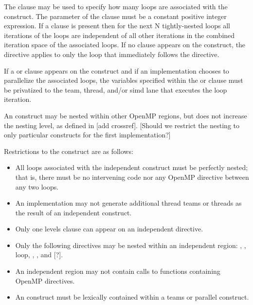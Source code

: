 The  clause may be used to specify how many loops are associated with the
 construct. The parameter of the  clause must be
a constant positive integer expression. If a  clause is present then for the next N
tightly-nested loops all iterations of the loops are independent of all other
iterations in the combined iteration space of the associated loops. If no
 clause appears on the construct, the  directive
applies to only the loop that immediately follows the directive.

If a  or  clause appears on the
 construct and if
an implementation chooses to parallelize the associated loops, the variables
specified within the  or  clause must be privatized to the team, thread,
and/or simd lane that executes the loop iteration.

An  construct may be nested within other OpenMP regions, but does
not increase the nesting level, as defined in [add crossref]. [Should we
restrict the nesting to only particular constructs for the first
implementation?]

\restrictions
Restrictions to the  construct are as follows:

\begin{itemize}
  \item All loops associated with the independent construct must be perfectly
    nested; that is, there must be no intervening code nor any OpenMP directive
    between any two loops.
    
  \item An implementation may not generate additional thread teams or threads
    as the result of an independent construct.

  \item Only one levels clause can appear on an independent directive.
  
  \item Only the following directives may be nested within an independent
    region: , , loop, , 
    , and [?]. %

  \item An independent region may not contain calls to functions containing
    OpenMP directives. %
    
  \item An  construct must be lexically contained within a teams or
    parallel construct. 

\end{itemize}

